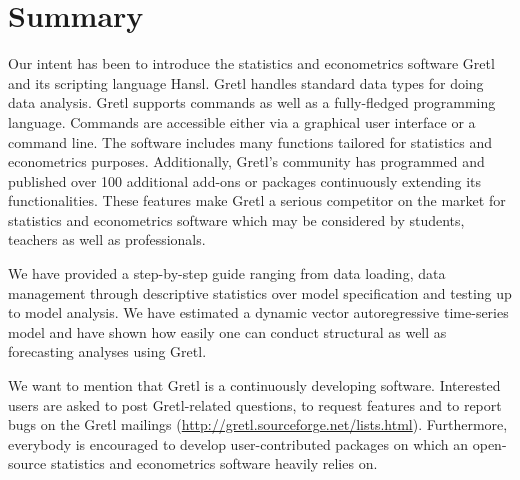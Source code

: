 \documentclass[11pt]{article}
\begin{document}
\section{Summary}
Our intent has been to introduce the statistics and econometrics software Gretl and its scripting language Hansl. Gretl handles standard data types for doing data analysis. Gretl supports commands as well as a fully-fledged programming language. Commands are accessible either via a graphical user interface or a command line. The software includes many functions tailored for statistics and econometrics purposes. Additionally, Gretl's community has programmed and published over 100 additional add-ons or packages continuously extending its functionalities. These features make Gretl a serious competitor on the market for statistics and econometrics software which may be considered by students, teachers as well as professionals.

We have provided a step-by-step guide ranging from data loading, data management through descriptive statistics over model specification and testing up to model analysis. We have estimated a dynamic vector autoregressive time-series model and have shown how easily one can conduct structural as well as forecasting analyses using Gretl.

We want to mention that Gretl is a continuously developing software. Interested users are asked to post Gretl-related questions, to request features and to report bugs on the Gretl mailings (\url{http://gretl.sourceforge.net/lists.html}). Furthermore, everybody is encouraged to develop user-contributed packages on which an open-source statistics and econometrics software heavily relies on.





\newpage

\appendix
\setcounter{table}{0}
\renewcommand{\thetable}{A\arabic{table}}
\setcounter{figure}{0}
\renewcommand{\thefigure}{A\arabic{figure}}
\end{document}
